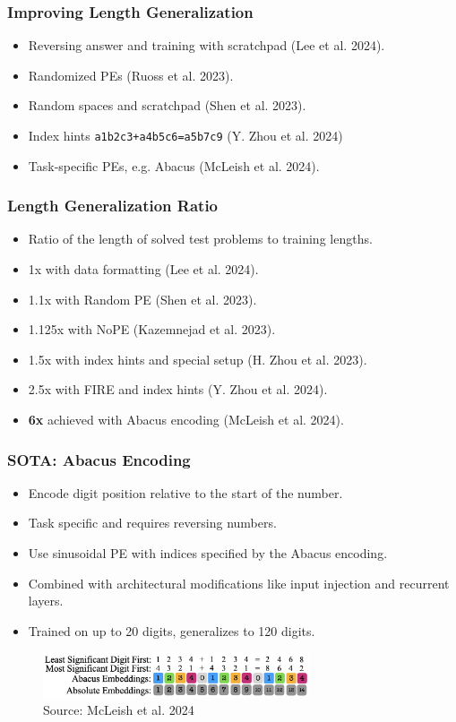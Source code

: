 \documentclass[14pt,aspectratio=169]{beamer}
\theoremstyle{remark}
\begin{document}
\begin{frame}
    \frametitle{Improving Length Generalization}
    \begin{itemize}
        \item Reversing answer and training with scratchpad (Lee et al. 2024).
        \item Randomized PEs (Ruoss et al. 2023).
        \item Random spaces and scratchpad (Shen et al. 2023).
        \item Index hints \texttt{a1b2c3+a4b5c6=a5b7c9} (Y. Zhou et al. 2024)
        \item Task-specific PEs, e.g. Abacus (McLeish et al. 2024).
    \end{itemize}
\end{frame}

\begin{frame}
    \frametitle{Length Generalization Ratio}
    \begin{itemize}
        \item Ratio of the length of solved test problems to training lengths.
        \item 1x with data formatting (Lee et al. 2024).
        \item 1.1x with Random PE (Shen et al. 2023).
        \item 1.125x with NoPE (Kazemnejad et al. 2023).
        \item 1.5x with index hints and special setup (H. Zhou et al. 2023).
        \item 2.5x with FIRE and index hints (Y. Zhou et al. 2024).
        \item \textbf{6x} achieved with Abacus encoding (McLeish et al. 2024).
    \end{itemize}
\end{frame}

\begin{frame}
    \frametitle{SOTA: Abacus Encoding}
    \begin{itemize}
        \item Encode digit position relative to the start of the number.
        \item Task specific and requires reversing numbers.
        \item Use sinusoidal PE with indices specified by the Abacus encoding.
        \item Combined with architectural modifications like input injection and recurrent layers.
        \item Trained on up to 20 digits, generalizes to 120 digits.
    \end{itemize}
    \begin{figure}
        \centering
        \includegraphics[width=0.7\textwidth]{fig/abacus.png}
        \caption{Source: McLeish et al. 2024}
    \end{figure}
\end{frame}
\end{document}
